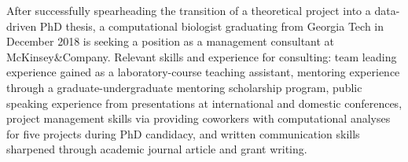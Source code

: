 

\begin{cventries}


\fontsize{10pt}{1em}\bodyfontlight\upshape\color{black}\justify
After successfully spearheading the transition of a theoretical project into a data-driven PhD thesis, a computational biologist graduating from Georgia Tech in December 2018 is seeking a position as a management consultant at McKinsey\&Company. Relevant skills and experience for consulting: team leading experience gained as a laboratory-course teaching assistant, mentoring experience through a graduate-undergraduate mentoring scholarship program, public speaking experience from presentations at international and domestic conferences, project management skills via providing coworkers with computational analyses for five projects during PhD candidacy, and written communication skills sharpened through academic journal article and grant writing.
    
\vspace{-2.0mm}
\end{cventries}
